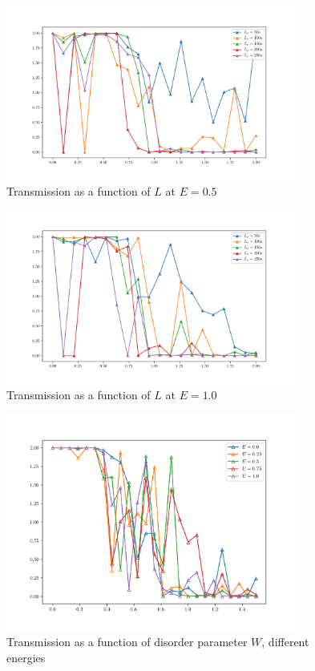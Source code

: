 \documentclass[12pt]{article}
\numberwithin{equation}{section}
\begin{document}
\newpage
\begin{figure}[h!]
  \begin{center}
  \includegraphics[width=0.85\textwidth]{./media/transmission_dep_L_E=0dot5.png}
  \caption{Transmission as a function of $L$ at $E=0.5$}
  \end{center}
\end{figure}

\newpage
\begin{figure}[h!]
  \begin{center}
  \includegraphics[width=0.85\textwidth]{./media/transmission_dep_L_E=1dot0.png}
  \caption{Transmission as a function of $L$ at $E=1.0$}
  \end{center}
\end{figure}

\newpage
\begin{figure}[h!]
  \begin{center}
  \includegraphics[width=0.85\textwidth]{./media/transmissions_wmax=1dot5.png}
  \caption{Transmission as a function of disorder parameter $W$, different energies}
  \end{center}
\end{figure}
\end{document}
